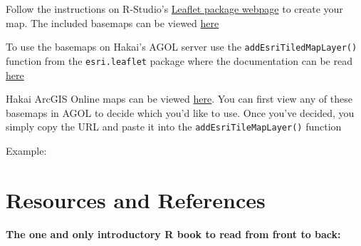 \documentclass[]{book}
\newenvironment{Shaded}{\begin{snugshade}}{\end{snugshade}}
\newcommand{\KeywordTok}[1]{\textcolor[rgb]{0.13,0.29,0.53}{\textbf{#1}}}
\newcommand{\DataTypeTok}[1]{\textcolor[rgb]{0.13,0.29,0.53}{#1}}
\newcommand{\DecValTok}[1]{\textcolor[rgb]{0.00,0.00,0.81}{#1}}
\newcommand{\FloatTok}[1]{\textcolor[rgb]{0.00,0.00,0.81}{#1}}
\newcommand{\StringTok}[1]{\textcolor[rgb]{0.31,0.60,0.02}{#1}}
\newcommand{\CommentTok}[1]{\textcolor[rgb]{0.56,0.35,0.01}{\textit{#1}}}
\newcommand{\OperatorTok}[1]{\textcolor[rgb]{0.81,0.36,0.00}{\textbf{#1}}}
\newcommand{\NormalTok}[1]{#1}
\begin{document}
\hypertarget{htmlwidget-4971c593cda9a1b0991a}{}

Follow the instructions on R-Studio's
\href{https://rstudio.github.io/leaflet/}{Leaflet package webpage} to
create your map. The included basemaps can be viewed
\href{https://leaflet-extras.github.io/leaflet-providers/preview/index.html}{here}

To use the basemaps on Hakai's AGOL server use the
\texttt{addEsriTiledMapLayer()} function from the \texttt{esri.leaflet}
package where the documentation can be read
\href{https://bhaskarvk.github.io/leaflet.esri/reference/addEsriTiledMapLayer.html}{here}

Hakai ArcGIS Online maps can be viewed
\href{https://ags.hakai.org:6443/arcgis/rest/services/AGOL_basemaps/}{here}.
You can first view any of these basemaps in AGOL to decide which you'd
like to use. Once you've decided, you simply copy the URL and paste it
into the \texttt{addEsriTileMapLayer()} function

Example:

\begin{Shaded}
\end{Shaded}

\hypertarget{htmlwidget-6f7873598278fb668f1e}{}

\chapter{Resources and References}\label{resources-and-references}

\textbf{The one and only introductory R book to read from front to
back:}
\end{document}
